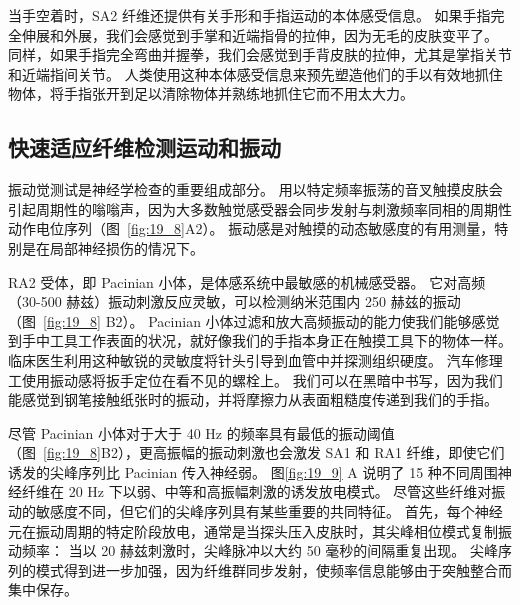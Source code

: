 当手空着时，SA2 纤维还提供有关手形和手指运动的本体感受信息。
如果手指完全伸展和外展，我们会感觉到手掌和近端指骨的拉伸，因为无毛的皮肤变平了。
同样，如果手指完全弯曲并握拳，我们会感觉到手背皮肤的拉伸，尤其是掌指关节和近端指间关节。
人类使用这种本体感受信息来预先塑造他们的手以有效地抓住物体，将手指张开到足以清除物体并熟练地抓住它而不用太大力。



\subsection{快速适应纤维检测运动和振动}

振动觉测试是神经学检查的重要组成部分。
用以特定频率振荡的音叉触摸皮肤会引起周期性的嗡嗡声，因为大多数触觉感受器会同步发射与刺激频率同相的周期性动作电位序列（图~\ref{fig:19_8}A2）。
振动感是对触摸的动态敏感度的有用测量，特别是在局部神经损伤的情况下。


RA2 受体，即 Pacinian 小体，是体感系统中最敏感的机械感受器。
它对高频（30-500 赫兹）振动刺激反应灵敏，可以检测纳米范围内 250 赫兹的振动（图~\ref{fig:19_8} B2）。
Pacinian 小体过滤和放大高频振动的能力使我们能够感觉到手中工具工作表面的状况，就好像我们的手指本身正在触摸工具下的物体一样。
临床医生利用这种敏锐的灵敏度将针头引导到血管中并探测组织硬度。
汽车修理工使用振动感将扳手定位在看不见的螺栓上。
我们可以在黑暗中书写，因为我们能感觉到钢笔接触纸张时的振动，并将摩擦力从表面粗糙度传递到我们的手指。


尽管 Pacinian 小体对于大于 40 Hz 的频率具有最低的振动阈值（图~\ref{fig:19_8}B2），更高振幅的振动刺激也会激发 SA1 和 RA1 纤维，即使它们诱发的尖峰序列比 Pacinian 传入神经弱。
图\ref{fig:19_9} A 说明了 15 种不同周围神经纤维在 20 Hz 下以弱、中等和高振幅刺激的诱发放电模式。
尽管这些纤维对振动的敏感度不同，但它们的尖峰序列具有某些重要的共同特征。
首先，每个神经元在振动周期的特定阶段放电，通常是当探头压入皮肤时，其尖峰相位模式复制振动频率：
当以 20 赫兹刺激时，尖峰脉冲以大约 50 毫秒的间隔重复出现。
尖峰序列的模式得到进一步加强，因为纤维群同步发射，使频率信息能够由于突触整合而集中保存。


